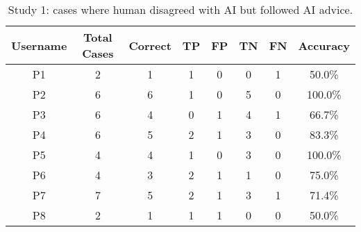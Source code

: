 \begin{table}[]
\caption{
Study 1: cases where human disagreed with AI but followed AI advice.}
\begin{tabular}{@{}cccccccc@{}}
\toprule
\textbf{Username} & \textbf{Total Cases} &  \textbf{Correct} & \textbf{TP} & \textbf{FP} & \textbf{TN} & \textbf{FN} & \textbf{Accuracy} \\
\midrule
P1   & 2              & 1                & 1           & 0           & 0           & 1           & 50.0\%          \\
P2  & 6              & 6                & 1           & 0           & 5           & 0           & 100.0\%            \\
P3         & 6              & 4                & 0           & 1           & 4           & 1           & 66.7\%     \\
P4   & 6              & 5                & 2           & 1           & 3           & 0           & 83.3\%     \\
P5    & 4              & 4                & 1           & 0           & 3           & 0           & 100.0\%            \\
P6    & 4              & 3                & 2           & 1           & 1           & 0           & 75.0\%         \\
P7      & 7              & 5                & 2           & 1           & 3           & 1           & 71.4\%     \\
P8 & 2              & 1                & 1           & 1           & 0           & 0           & 50.0\%          \\ \bottomrule
\end{tabular}
\label{tab:study1-fine-4}
\end{table}









